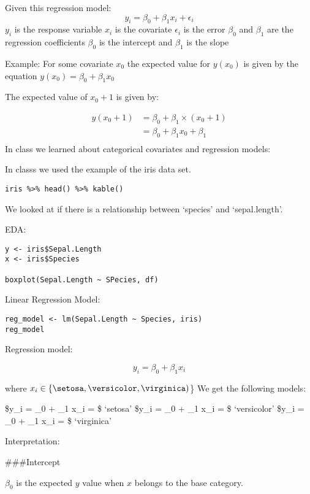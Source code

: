 \documentclass[
  letterpaper,
  DIV=11,
  numbers=noendperiod]{scrartcl}
\begin{document}
Given this regression model: \[
y_i = \beta_0 + \beta_1 x_i + \epsilon_i
\] \(y_i\) is the response variable \(x_i\) is the covariate
\(\epsilon_i\) is the error \(\beta_0\) and \(\beta_1\) are the
regression coefficients \(\beta_0\) is the intercept and \(\beta_1\) is
the slope

Example: For some covariate \(x_0\) the expected value for \(y(x_0)\) is
given by the equation \(y(x_0) = \beta_0 + \beta_1 x_0\)

The expected value of \(x_0 + 1\) is given by:

\[
\begin{align}
y(x_0 +1) &= \beta_0 + \beta_1 \times (x_0 + 1)\\
&= \beta_0 + \beta_1 x_0 + \beta_1\\
\end{align}
\] In class we learned about categorical covariates and regression
models:

In classs we used the example of the iris data set.

\begin{verbatim}
iris %>% head() %>% kable()
\end{verbatim}

We looked at if there is a relationship between `species' and
`sepal.length'.

EDA:

\begin{verbatim}
y <- iris$Sepal.Length
x <- iris$Species

boxplot(Sepal.Length ~ SPecies, df)
\end{verbatim}

Linear Regression Model:

\begin{verbatim}
reg_model <- lm(Sepal.Length ~ Species, iris)
reg_model
\end{verbatim}

Regression model:

\[
y_i = \beta_0 + \beta_1 x_i
\]

where \(x_i \in \{ \setosa, \versicolor, \virginica)\)\} We get the
following models:

\$y\_i = \beta\_0 + \beta\_1 x\_i = \$ `setosa' \$y\_i = \beta\_0 +
\beta\_1 x\_i = \$ `versicolor' \$y\_i = \beta\_0 + \beta\_1 x\_i = \$
`virginica'

Interpretation:

\#\#\#Intercept

\(\beta_0\) is the expected \(y\) value when \(x\) belongs to the base
category.
\end{document}
